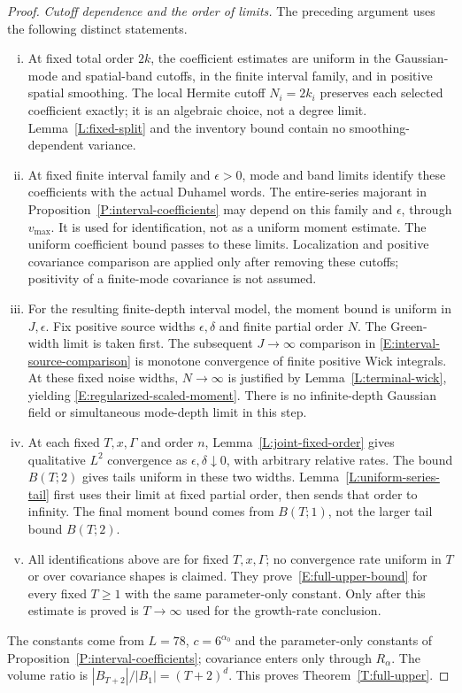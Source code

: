 \documentclass[12pt]{article}
\numberwithin{equation}{section}
\theoremstyle{definition}
\begin{document}
\begin{proof}
  \emph{Cutoff dependence and the order of limits.}
  The preceding argument uses the following distinct statements.
  \begin{enumerate}[(i)]
    \item At fixed total order $2k$, the coefficient estimates are uniform
      in the Gaussian-mode and spatial-band cutoffs, in the finite interval
      family, and in positive spatial smoothing. The local Hermite cutoff
      $N_i=2k_i$ preserves each selected coefficient exactly; it is an
      algebraic choice, not a degree limit. Lemma~\ref{L:fixed-split} and
      the inventory bound contain no smoothing-dependent variance.
    \item At fixed finite interval family and $\epsilon>0$, mode and band
      limits identify these coefficients with the actual Duhamel words.
      The entire-series majorant in Proposition~\ref{P:interval-coefficients}
      may depend on this family and $\epsilon$, through $v_{\max}$.
      It is used for identification, not as a uniform moment estimate.
      The uniform coefficient bound passes to these limits. Localization
      and positive covariance comparison are applied only after removing
      these cutoffs; positivity of a finite-mode covariance is not assumed.
    \item For the resulting finite-depth interval model, the moment bound
      is uniform in $J,\epsilon$. Fix positive source widths
      $\epsilon,\delta$ and finite partial order $N$. The Green-width limit
      is taken first. The subsequent $J\to\infty$ comparison in
      \eqref{E:interval-source-comparison} is monotone convergence of finite
      positive Wick integrals. At these fixed noise widths,
      $N\to\infty$ is justified by Lemma~\ref{L:terminal-wick}, yielding
      \eqref{E:regularized-scaled-moment}. There is no infinite-depth
      Gaussian field or simultaneous mode-depth limit in this step.
    \item At each fixed $T,x,\Gamma$ and order $n$,
      Lemma~\ref{L:joint-fixed-order} gives qualitative $L^2$ convergence as
      $\epsilon,\delta\downarrow0$, with arbitrary relative rates.
      The bound $B(T;2)$ gives tails uniform in these two widths.
      Lemma~\ref{L:uniform-series-tail} first uses their limit at fixed
      partial order, then sends that order to infinity. The final moment
      bound comes from $B(T;1)$, not the larger tail bound $B(T;2)$.
    \item All identifications above are for fixed $T,x,\Gamma$; no
      convergence rate uniform in $T$ or over covariance shapes is claimed.
      They prove~\eqref{E:full-upper-bound} for every fixed $T\ge1$ with
      the same parameter-only constant. Only after this estimate is proved
      is $T\to\infty$ used for the growth-rate conclusion.
  \end{enumerate}
  The constants come from $L=78$, $c=6^{\alpha_0}$ and the parameter-only
  constants of Proposition~\ref{P:interval-coefficients}; covariance enters
  only through $R_\alpha$.
  The volume ratio is $|B_{T+2}|/|B_1|=(T+2)^d$.
  This proves Theorem~\ref{T:full-upper}.
\end{proof}
\end{document}
